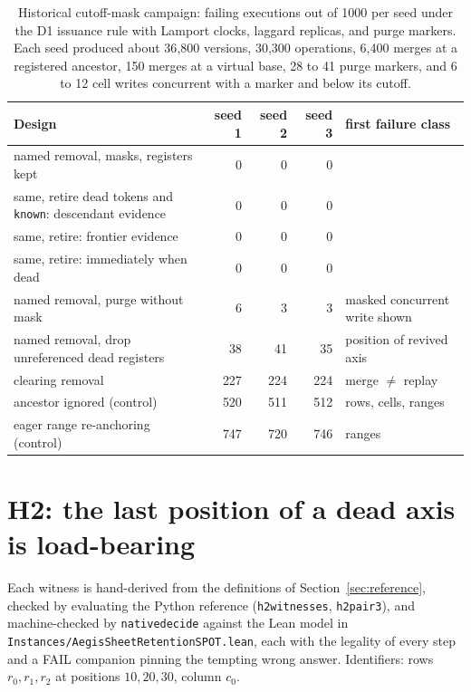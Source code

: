 \documentclass[11pt]{article}
\newcommand{\lean}[1]{\texttt{\def\_{\textunderscore\allowbreak}#1}}
\begin{document}
\begin{table}[h]
\centering\small
\begin{tabular}{@{}p{}rrrp{}@{}}
\toprule
Design & seed 1 & seed 2 & seed 3 & first failure class \\
\midrule
named removal, masks, registers kept & 0 & 0 & 0 & \\
same, retire dead tokens and \lean{known}: descendant evidence & 0 & 0 & 0 & \\
same, retire: frontier evidence & 0 & 0 & 0 & \\
same, retire: immediately when dead & 0 & 0 & 0 & \\
named removal, purge without mask & 6 & 3 & 3 & masked concurrent write shown \\
named removal, drop unreferenced dead registers & 38 & 41 & 35 & position of revived axis \\
clearing removal & 227 & 224 & 224 & merge $\neq$ replay \\
ancestor ignored (control) & 520 & 511 & 512 & rows, cells, ranges \\
eager range re-anchoring (control) & 747 & 720 & 746 & ranges \\
\bottomrule
\end{tabular}
\caption{Historical cutoff-mask campaign: failing executions out of 1000 per seed under the D1 issuance
rule with Lamport clocks, laggard replicas, and purge markers. Each seed
produced about 36{,}800 versions, 30{,}300 operations, 6{,}400 merges at a
registered ancestor, 150 merges at a virtual base, 28 to 41 purge markers,
and 6 to 12 cell writes concurrent with a marker and below its cutoff.}
\label{tab:campaign}
\end{table}

\section{H2: the last position of a dead axis is load-bearing}
\label{sec:h2}

Each witness is hand-derived from the definitions of
Section~\ref{sec:reference}, checked by evaluating the Python reference
(\lean{h2\_witnesses}, \lean{h2\_pair3}), and machine-checked by
\lean{native\_decide} against the Lean model in
\lean{Instances/AegisSheetRetentionSPOT.lean}, each with the legality of
every step and a FAIL companion pinning the tempting wrong answer.
Identifiers: rows $r_0,r_1,r_2$ at positions $10,20,30$, column $c_0$.
\end{document}
